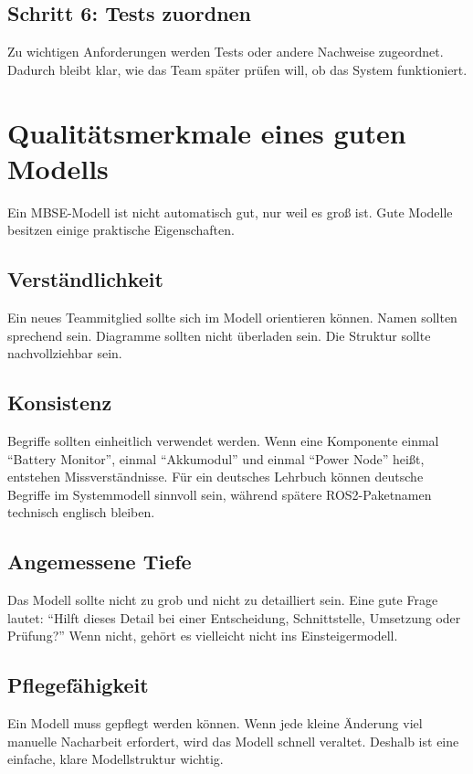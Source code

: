 \subsection{Schritt 6: Tests zuordnen}
Zu wichtigen Anforderungen werden Tests oder andere Nachweise zugeordnet. Dadurch bleibt klar, wie das Team später prüfen will, ob das System funktioniert.

\section{Qualitätsmerkmale eines guten Modells}
Ein MBSE-Modell ist nicht automatisch gut, nur weil es groß ist. Gute Modelle besitzen einige praktische Eigenschaften.

\subsection{Verständlichkeit}
Ein neues Teammitglied sollte sich im Modell orientieren können. Namen sollten sprechend sein. Diagramme sollten nicht überladen sein. Die Struktur sollte nachvollziehbar sein.

\subsection{Konsistenz}
Begriffe sollten einheitlich verwendet werden. Wenn eine Komponente einmal \enquote{Battery Monitor}, einmal \enquote{Akkumodul} und einmal \enquote{Power Node} heißt, entstehen Missverständnisse. Für ein deutsches Lehrbuch können deutsche Begriffe im Systemmodell sinnvoll sein, während spätere ROS2-Paketnamen technisch englisch bleiben.

\subsection{Angemessene Tiefe}
Das Modell sollte nicht zu grob und nicht zu detailliert sein. Eine gute Frage lautet: \enquote{Hilft dieses Detail bei einer Entscheidung, Schnittstelle, Umsetzung oder Prüfung?} Wenn nicht, gehört es vielleicht nicht ins Einsteigermodell.

\subsection{Pflegefähigkeit}
Ein Modell muss gepflegt werden können. Wenn jede kleine Änderung viel manuelle Nacharbeit erfordert, wird das Modell schnell veraltet. Deshalb ist eine einfache, klare Modellstruktur wichtig.

